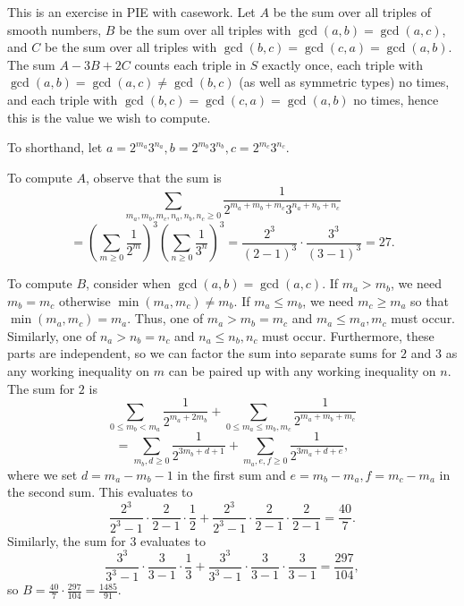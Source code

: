 This is an exercise in PIE with casework. Let $A$ be the sum over all triples of smooth numbers, $B$ be the sum over all triples with $\gcd\left(a,b\right)=\gcd\left(a,c\right)$, and $C$ be the sum over all triples with $\gcd\left(b,c\right)=\gcd\left(c,a\right)=\gcd\left(a,b\right)$. The sum $A-3B+2C$ counts each triple in $S$ exactly once, each triple with $\gcd\left(a,b\right)=\gcd\left(a,c\right)\neq\gcd\left(b,c\right)$ (as well as symmetric types) no times, and each triple with $\gcd\left(b,c\right)=\gcd\left(c,a\right)=\gcd\left(a,b\right)$ no times, hence this is the value we wish to compute.

To shorthand, let $a=2^{m_a}3^{n_a},b=2^{m_b}3^{n_b},c=2^{m_c}3^{n_c}$.

To compute $A$, observe that the sum is \[\displaystyle\sum_{m_a,m_b,m_c,n_a,n_b,n_c\geq0}\frac{1}{2^{m_a+m_b+m_c}3^{n_a+n_b+n_c}}\]\[=\left(\displaystyle\sum_{m\geq0}\frac{1}{2^m}\right)^3\left(\displaystyle\sum_{n\geq0}\frac{1}{3^n}\right)^3=\frac{2^3}{\left(2-1\right)^3}\cdot\frac{3^3}{\left(3-1\right)^3}=27.\]

To compute $B$, consider when $\gcd\left(a,b\right)=\gcd\left(a,c\right)$. If $m_a>m_b$, we need $m_b=m_c$ otherwise $\min\left(m_a,m_c\right)\neq m_b$. If $m_a\leq m_b$, we need $m_c\geq m_a$ so that $\min\left(m_a,m_c\right)=m_a$. Thus, one of $m_a>m_b=m_c$ and $m_a\leq m_a,m_c$ must occur. Similarly, one of $n_a>n_b=n_c$ and $n_a\leq n_b,n_c$ must occur. Furthermore, these parts are independent, so we can factor the sum into separate sums for $2$ and $3$ as any working inequality on $m$ can be paired up with any working inequality on $n$. The sum for $2$ is \[\displaystyle\sum_{0\leq m_b<m_a}\frac{1}{2^{m_a+2m_b}}+\displaystyle\sum_{0\leq m_a\leq m_b,m_c}\frac{1}{2^{m_a+m_b+m_c}}\]\[=\displaystyle\sum_{m_b,d\geq0}\frac{1}{2^{3m_b+d+1}}+\displaystyle\sum_{m_a,e,f\geq0}\frac{1}{2^{3m_a+d+e}},\] where we set $d=m_a-m_b-1$ in the first sum and $e=m_b-m_a,f=m_c-m_a$ in the second sum. This evaluates to \[\frac{2^3}{2^3-1}\cdot\frac{2}{2-1}\cdot\frac{1}{2}+\frac{2^3}{2^3-1}\cdot\frac{2}{2-1}\cdot\frac{2}{2-1}=\frac{40}{7}.\] Similarly, the sum for $3$ evaluates to \[\frac{3^3}{3^3-1}\cdot\frac{3}{3-1}\cdot\frac{1}{3}+\frac{3^3}{3^3-1}\cdot\frac{3}{3-1}\cdot\frac{3}{3-1}=\frac{297}{104},\] so $B=\frac{40}{7}\cdot\frac{297}{104}=\frac{1485}{91}$.

